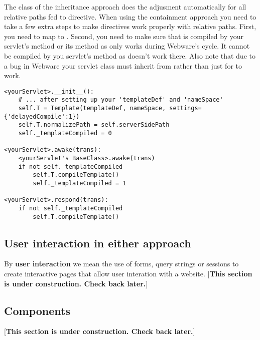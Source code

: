 The  class of the inheritance approach does the adjusment
automatically for all relative paths fed to  directive.  When
using the containment approach you need to take a few extra steps to make
 directives work properly with relative paths. First, you need
to map  to
. Second, you need to make sure that
 is compiled by your servlet's  method or
its  method as  only works during
Webware's  cycle.  It cannot be compiled by you
servlet's  method as  doesn't
work there.  Also note that due to a bug in Webware your servlet class must
inherit from  rather than just  for
 to work.

\begin{verbatim}
<yourServlet>.__init__():
    # ... after setting up your 'templateDef' and 'nameSpace'
    self.T = Template(templateDef, nameSpace, settings={'delayedCompile':1})
    self.T.normalizePath = self.serverSidePath
    self._templateCompiled = 0

<yourServlet>.awake(trans):
    <yourServlet's BaseClass>.awake(trans)
    if not self._templateCompiled
        self.T.compileTemplate()
        self._templateCompiled = 1

<yourServlet>.respond(trans):
    if not self._templateCompiled
        self.T.compileTemplate()
\end{verbatim}


\subsection{User interaction in either approach}
\label{webware.userInteraction}

By {\bf user interaction} we mean the use of forms, query strings or sessions to
create interactive pages that allow user interation with a website.
[{\bf This section is under construction. Check back later.}]

\subsection{Components}
\label{webware.components}
[{\bf This section is under construction. Check back later.}]

